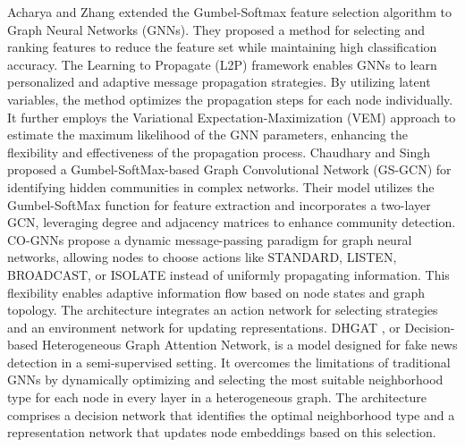 Acharya and Zhang \cite{acharya2020feature} extended the Gumbel-Softmax feature selection algorithm to Graph Neural Networks (GNNs). They proposed a method for selecting and ranking features to reduce the feature set while maintaining high classification accuracy. 
The Learning to Propagate (L2P) \cite{xiao2021learning} framework enables GNNs to learn personalized and adaptive message propagation strategies. By utilizing latent variables, the method optimizes the propagation steps for each node individually. It further employs the Variational Expectation-Maximization (VEM) approach to estimate the maximum likelihood of the GNN parameters, enhancing the flexibility and effectiveness of the propagation process.
Chaudhary and Singh \cite{chaudhary2023gumbel} proposed a Gumbel-SoftMax-based Graph Convolutional Network (GS-GCN) for identifying hidden communities in complex networks. Their model utilizes the Gumbel-SoftMax function for feature extraction and incorporates a two-layer GCN, leveraging degree and adjacency matrices to enhance community detection.
CO-GNNs \cite{DBLP:conf/icml/FinkelshteinHBC24} propose a dynamic message-passing paradigm for graph neural networks, allowing nodes to choose actions like STANDARD, LISTEN, BROADCAST, or ISOLATE instead of uniformly propagating information. This flexibility enables adaptive information flow based on node states and graph topology. The architecture integrates an action network for selecting strategies and an environment network for updating representations.
DHGAT \cite{lakzaei2025decision}, or Decision-based Heterogeneous Graph Attention Network, is a model designed for fake news detection in a semi-supervised setting. It overcomes the limitations of traditional GNNs by dynamically optimizing and selecting the most suitable neighborhood type for each node in every layer in a heterogeneous graph. The architecture comprises a decision network that identifies the optimal neighborhood type and a representation network that updates node embeddings based on this selection.

